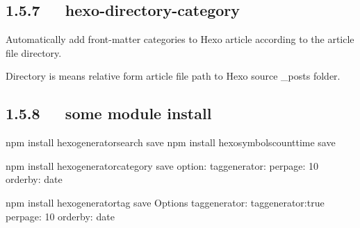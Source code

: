 \documentclass[letterpaper,12pt,english]{sphinxmanual}
\begin{document}
\subsection{1.5.7   hexo-directory-category}
\label{\detokenize{001software/001install/001._u7f51_u7ad9/hexo:hexo-directory-category}}
Automatically add front-matter categories to Hexo article according to the article file directory.

Directory is means relative form article file path to Hexo source \_posts folder.


\begin{sphinxVerbatim}[commandchars=\\\{\}]
   
       
      
       
             
\end{sphinxVerbatim}


\subsection{1.5.8   some module install}
\label{\detokenize{001software/001install/001._u7f51_u7ad9/hexo:some-module-install}}
\begin{sphinxVerbatim}[commandchars=\\\{\}]
\PYGZdl{} npm install hexo\PYGZhy{}generator\PYGZhy{}search \PYGZhy{}\PYGZhy{}save
\PYGZdl{} npm install hexo\PYGZhy{}symbols\PYGZhy{}count\PYGZhy{}time \PYGZhy{}\PYGZhy{}save


\PYGZdl{} npm install hexo\PYGZhy{}generator\PYGZhy{}category \PYGZhy{}\PYGZhy{}save
option:
tag\PYGZus{}generator:
  per\PYGZus{}page: 10
  order\PYGZus{}by: \PYGZhy{}date


\PYGZdl{} npm install hexo\PYGZhy{}generator\PYGZhy{}tag \PYGZhy{}\PYGZhy{}save
Options
tag\PYGZus{}generator:
  tag\PYGZus{}generator:true
  per\PYGZus{}page: 10
  order\PYGZus{}by: \PYGZhy{}date
\end{sphinxVerbatim}
\end{document}
